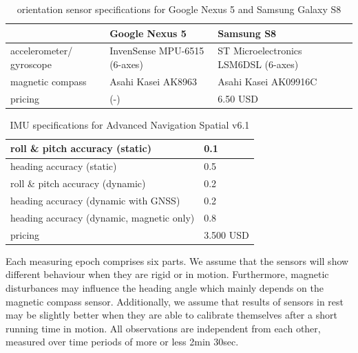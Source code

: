 \documentclass[review]{elsarticle}
\begin{document}
\begin{center}
\begin{small}
\begin{longtable}[HT]{| p{2.5cm} | p{3cm} | p{4cm} |}
	\caption{orientation sensor specifications for Google Nexus 5 and Samsung Galaxy S8}
	\label{table:sensor:specs}
	\endhead
		\hline
		 & Google Nexus 5 & Samsung S8 \\ \hline
		accelerometer/ gyroscope & InvenSense MPU-6515 (6-axes) & {ST Microelectronics} LSM6DSL (6-axes) \\ \hline
		magnetic compass & Asahi Kasei AK8963 & Asahi Kasei AK09916C \\ \hline
		pricing & (-) & 6.50 USD                                                                           \\ \hline
\end{longtable}
\end{small}
\end{center}


\begin{center}
\begin{small}
\begin{longtable}[HT]{| p{8cm} | p{2cm} |}
	\caption{\gls{IMU} specifications for Advanced Navigation Spatial v6.1}
	\label{table:sensor:imu}
	\endhead
		\hline
		roll \& pitch accuracy (static) & 0.1 \\ \hline
		heading accuracy (static) & 0.5 \\ \hline
		roll \& pitch accuracy (dynamic) & 0.2 \\ \hline
		heading accuracy (dynamic with \gls{GNSS}) & 0.2 \\ \hline
		heading accuracy (dynamic, magnetic only) & 0.8 \\ \hline
		pricing & 3.500 USD                                                                  \\ \hline
\end{longtable}
\end{small}
\end{center}



Each measuring epoch comprises six parts. We assume that the sensors will show different behaviour when they are rigid or in motion. Furthermore, magnetic disturbances may influence the heading angle which mainly depends on the magnetic compass sensor. Additionally, we assume that results of sensors in rest may be slightly better when they are able to calibrate themselves after a short running time in motion. All observations are independent from each other, measured over time periods of more or less 2min 30sec. 
\end{document}

